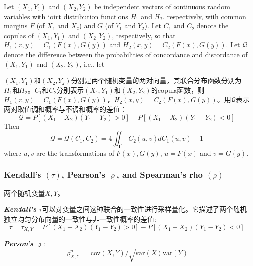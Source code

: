 \begin{theorem}\cite{Bill2000An}
    Let $(X_1,Y_1)$ and $(X_2,Y_2)$ be independent vectors of continuous random variables with joint distribution functions $H_1$ and $H_2$, respectively, with common margins $F$ (of $X_1$ and $X_2$) and $G$ (of $Y_1$ and $Y_2$). Let $C_1$ and $C_2$ denote the copulas of $(X_1,Y_1)$ and $(X_2,Y_2)$, respectively, so that $H_1(x,y) = C_1(F(x), G(y))$ and $H_2(x,y) = C_2(F(x),G(y))$. Let $\mathcal{Q}$ denote the difference between the probabilities of concordance and discordance of $(X_1,Y_1)$ and $(X_2,Y_2)$, i.e., let

    $(X_1,Y_1)$和$(X_2,Y_2)$分别是两个随机变量的两对向量，其联合分布函数分别为$H_1$和$H_2$。$C_1$和$C_2$分别表示$(X_1,Y_1)$和$(X_2,Y_2)$的copula函数，则$H_1(x,y) = C_1(F(x),G(y))$，$H_2(x,y) = C_2(F(x),G(y))$。用$\mathcal{Q}$表示两对取值调和概率与不调和概率的差值：
    \begin{equation}
        \mathcal{Q} = P [(X_1-X_2)(Y_1-Y_2) > 0] - P[(X_1-X_2)(Y_1-Y_2)<0]
        \label{eq-diff}
    \end{equation}
    Then
    \begin{equation}
        \mathcal{Q} = \mathcal{Q}(C_1,C_2) = 4 \iint_{\mathbf{I}^2}C_2(u,v)dC_1(u,v)-1
        \label{eq-diff2}
    \end{equation}
    where $u,v$ are the transformations of $F(x),G(y)$, $u=F(x)$ and $v = G(y)$.
    \label{th5.1.1}
\end{theorem}



\subsubsection{Kendall's $(\tau)$, Pearson's $\varrho$, and Spearman's rho $(\rho)$}
两个随机变量$X,Y$。

\emph{\textbf{\textcolor[rgb]{1,0,0}{Kendall's $\tau$}}}可以对变量之间这种联合的一致性进行采样量化。它描述了两个随机独立均匀分布向量的一致性与非一致性概率的差值\cite{Montes2015}:
\begin{equation}
    \tau = \tau_{X,Y} = P[(X_1-X_2)(Y_1-Y_2) > 0] - P[(X_1-X_2)(Y_1-Y_2)<0]
    \label{eq-tau}
\end{equation}

\emph{\textbf{\textcolor[rgb]{1,0,0}{Person's $\varrho$}}}:
\begin{equation}   
    \label{eq-varrho}
    \varrho^{p}_{X,Y} = \text{cov}(X,Y)/\sqrt{\text{var}(X)\text{var}(Y)}
\end{equation}


